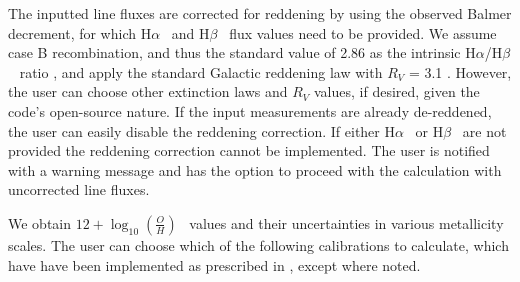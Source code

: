 \documentclass{emulateapj}
\newcommand{\oxab}{\ensuremath{12 + \log_{10}(\frac{O}{H})}}
\newcommand{\ha}{H$\alpha$}
\newcommand{\hb}{H$\beta$}
\begin{document}
The inputted line fluxes are corrected for reddening by using the observed Balmer decrement, for which \ha~ and  \hb~ flux values need to be provided. We assume case B recombination, and thus the standard value of 2.86 as the
intrinsic \ha/\hb~ ratio \citep{osterbrock89}, and apply the standard Galactic reddening law with $R_V$ = 3.1 \citep{cardelli89}. However, the user can choose other extinction laws and $R_V$ values, if desired, given the code's open-source nature. If the input measurements are already de-reddened, the user can easily disable the reddening correction. If either \ha~ or \hb~ are not provided the reddening correction cannot be implemented. The user is notified with a warning message and has the option to proceed with the calculation with uncorrected line fluxes.

We obtain \oxab~ values and their uncertainties in various metallicity scales.
 The user can choose which of the following calibrations to calculate, which have  have been implemented as prescribed in \citet{kewley08}, except where noted. 
\end{document}
